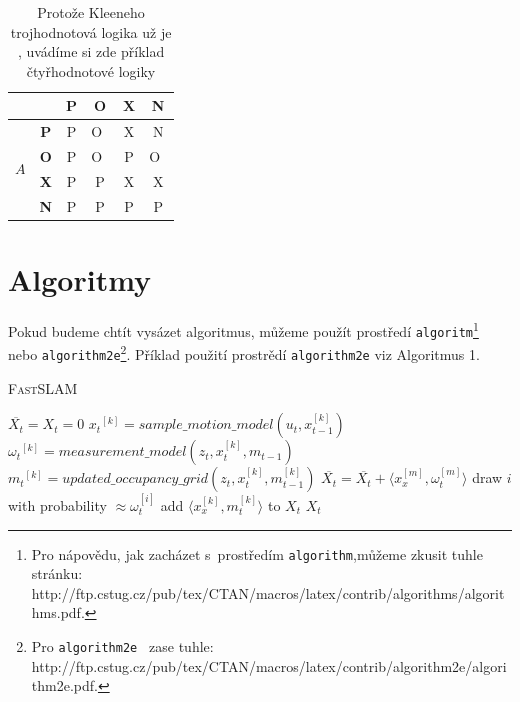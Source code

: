 \documentclass[11pt,a4paper]{article}
\begin{document}
\begin{table}[ht]
\begin{center}
\begin{tabular}{|c|c|c|c|c|c|}
				\multicolumn{2}{|c|}{} 
					& \textbf{P} & \textbf{O} & \textbf{X} & \textbf{N} \\ \hline
					\multirow{4}{*}{$A$} 
						& \textbf{P} & P & O~& X & N \\ \cline{2-6} 
 						& \textbf{O} & P & O~& P & O~\\ \cline{2-6}  
 						& \textbf{X} & P & P & X & X \\ \cline{2-6} 
 						& \textbf{N} & P & P & P & P \\ \hline 
		\end{tabular}
		\caption{Protože Kleeneho trojhodnotová logika už je , uvádíme si zde příklad čtyřhodnotové
logiky}
	\label{tabulka_2}
	\end{center}
\end{table}



\section{Algoritmy}

Pokud budeme chtít vysázet algoritmus, můžeme použít prostředí \texttt{algoritm}\footnote{Pro nápovědu, jak zacházet s~prostředím \texttt{algorithm},můžeme zkusit tuhle stránku: \\ http://ftp.cstug.cz/pub/tex/CTAN/macros/latex/contrib/algorithms/algorithms.pdf.} nebo \texttt{algorithm2e}\footnote{Pro \texttt{algorithm2e } zase tuhle: http://ftp.cstug.cz/pub/tex/CTAN/macros/latex/contrib/algorithm2e/algorithm2e.pdf.}. Příklad použití prostrědí \texttt{algorithm2e} viz Algoritmus 1.


\begin{algorithm}
	\label{algoritmus}
	\sloppy
	\caption{\textsc{Fast}SLAM}
	\DontPrintSemicolon
	\begin{algorithmic}[1]  
		\STATE $\overline{X_t}=X_t=0$
    		\STATE ${x_t}^{[k]}=sample\_motion\_model(u_t,x_{t-1}^{[k]})$
    		\STATE ${\omega_t}^{[k]}=measurement\_model(z_t,x_t^{[k]},m_{t-1})$
    		\STATE ${m_t}^{[k]}=updated\_occupancy\_grid(z_t,x_{t}^{[k]},m_{t-1}^{[k]})$
    		\STATE $\overline{X_t}=\overline{X_t} +\langle x_x^{[m]}, \omega_t^{[m]}\rangle$
		\ENDFOR
    		\STATE draw $i$ with probability $ \approx \omega_t^{[i]}$
    		\STATE add $\langle x_x^{[k]},m_t^{[k]}\rangle $ to $X_t$
		\ENDFOR
		\RETURN $X_t$ 
	\end{algorithmic} 
\end{algorithm}
\end{document}
